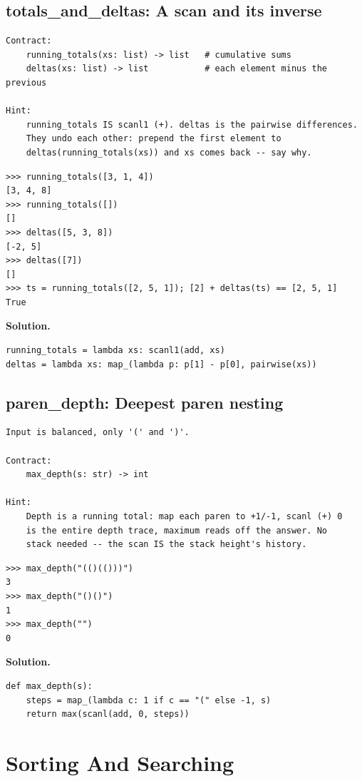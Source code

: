 \documentclass[10pt,letterpaper]{book}
\begin{document}
\section{totals\_and\_deltas: A scan and its inverse}
\begin{lstlisting}[style=ex]
Contract:
    running_totals(xs: list) -> list   # cumulative sums
    deltas(xs: list) -> list           # each element minus the previous

Hint:
    running_totals IS scanl1 (+). deltas is the pairwise differences.
    They undo each other: prepend the first element to
    deltas(running_totals(xs)) and xs comes back -- say why.
\end{lstlisting}
\begin{lstlisting}[style=ex]
>>> running_totals([3, 1, 4])
[3, 4, 8]
>>> running_totals([])
[]
>>> deltas([5, 3, 8])
[-2, 5]
>>> deltas([7])
[]
>>> ts = running_totals([2, 5, 1]); [2] + deltas(ts) == [2, 5, 1]
True
\end{lstlisting}
\noindent\textbf{Solution.}
\begin{lstlisting}[style=code]
running_totals = lambda xs: scanl1(add, xs)
deltas = lambda xs: map_(lambda p: p[1] - p[0], pairwise(xs))
\end{lstlisting}

\section{paren\_depth: Deepest paren nesting}
\begin{lstlisting}[style=ex]
Input is balanced, only '(' and ')'.

Contract:
    max_depth(s: str) -> int

Hint:
    Depth is a running total: map each paren to +1/-1, scanl (+) 0
    is the entire depth trace, maximum reads off the answer. No
    stack needed -- the scan IS the stack height's history.
\end{lstlisting}
\begin{lstlisting}[style=ex]
>>> max_depth("(()(()))")
3
>>> max_depth("()()")
1
>>> max_depth("")
0
\end{lstlisting}
\noindent\textbf{Solution.}
\begin{lstlisting}[style=code]
def max_depth(s):
    steps = map_(lambda c: 1 if c == "(" else -1, s)
    return max(scanl(add, 0, steps))
\end{lstlisting}
\chapter{Sorting And Searching}
\end{document}
